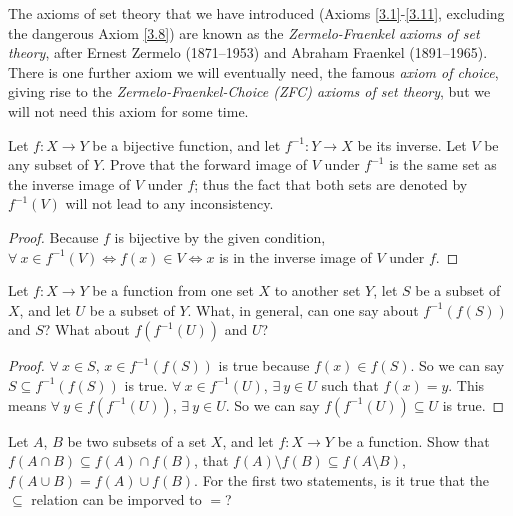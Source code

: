 \begin{remark}
The axioms of set theory that we have introduced (Axioms \ref{3.1}-\ref{3.11}, excluding the dangerous Axiom \ref{3.8}) are known as the \emph{Zermelo-Fraenkel axioms of set theory}, after Ernest Zermelo (1871--1953) and Abraham Fraenkel (1891--1965).
There is one further axiom we will eventually need, the famous \emph{axiom of choice}, giving rise to the \emph{Zermelo-Fraenkel-Choice (ZFC) axioms of set theory}, but we will not need this axiom for some time.
\end{remark}

\begin{exercise}\label{exercise 3.4.1}
Let \(f : X \to Y\) be a bijective function, and let \(f^{-1} : Y \to X\) be its inverse.
Let \(V\) be any subset of \(Y\).
Prove that the forward image of \(V\) under \(f^{-1}\) is the same set as the inverse image of \(V\) under \(f\);
thus the fact that both sets are denoted by \(f^{-1}(V)\) will not lead to any inconsistency.
\end{exercise}

\begin{proof}
Because \(f\) is bijective by the given condition, \(\forall\ x \in f^{-1}(V) \iff f(x) \in V \iff x\) is in the inverse image of \(V\) under \(f\).
\end{proof}

\begin{exercise}\label{exercise 3.4.2}
Let \(f : X \to Y\) be a function from one set \(X\) to another set \(Y\), let \(S\) be a subset of \(X\), and let \(U\) be a subset of \(Y\).
What, in general, can one say about \(f^{-1}(f(S))\) and \(S\)?
What about \(f(f^{-1}(U))\) and \(U\)?
\end{exercise}

\begin{proof}
\(\forall\ x \in S\), \(x \in f^{-1}(f(S))\) is true because \(f(x) \in f(S)\).
So we can say \(S \subseteq f^{-1}(f(S))\) is true.
\(\forall\ x \in f^{-1}(U)\), \(\exists\ y \in U\) such that \(f(x) = y\).
This means \(\forall\ y \in f(f^{-1}(U))\), \(\exists\ y \in U\).
So we can say \(f(f^{-1}(U)) \subseteq U\) is true.
\end{proof}

\begin{exercise}\label{exercise 3.4.3}
Let \(A\), \(B\) be two subsets of a set \(X\), and let \(f : X \to Y\) be a function.
Show that \(f(A \cap B) \subseteq f(A) \cap f(B)\), that \(f(A) \setminus f(B) \subseteq f(A \setminus B)\), \(f(A \cup B) = f(A) \cup f(B)\).
For the first two statements, is it true that the \(\subseteq\) relation can be imporved to \(=\)?
\end{exercise}


